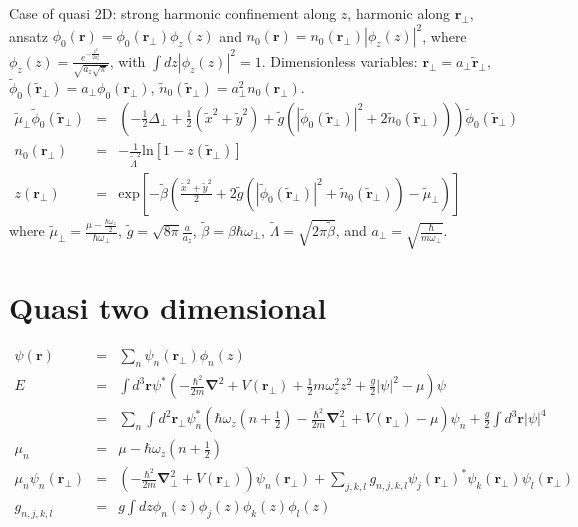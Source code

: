 \documentclass[12pt,a4paper]{report}
\newcommand{\abs}[1]{\left|#1\right|}
\renewcommand{\exp}[1]{\textrm{exp}\left[#1\right]}
\renewcommand{\ln}[1]{\textrm{ln}\left[#1\right]}
\begin{document}
Case of quasi 2D: strong harmonic confinement along $z$, harmonic along $\bm{r}_\perp$, ansatz $\phi_0(\bm{r})=\phi_0(\bm{r}_\perp)\phi_z(z)$ and $n_0(\bm{r})=n_0(\bm{r}_\perp)\abs{\phi_z(z)}^2$, where $\phi_z(z)=\frac{e^{-\frac{z^2}{2a_z^2}}}{\sqrt{a_z\sqrt{\pi}}}$, with $\int dz\abs{\phi_z(z)}^2=1$.
Dimensionless variables: $\bm{r}_\perp=a_\perp\tilde{\bm{r}}_\perp$, $\tilde{\phi}_0(\tilde{\bm{r}}_\perp)=a_\perp\phi_0(\bm{r}_\perp)$, $\tilde{n}_0(\tilde{\bm{r}}_\perp)=a_\perp^2n_0(\bm{r}_\perp)$.
\begin{eqnarray*}
\tilde{\mu}_\perp\tilde{\phi}_0(\tilde{\bm{r}}_\perp)
&=&\left(-\frac{1}{2}\Delta_\perp
+\frac{1}{2}(\tilde{x}^2+\tilde{y}^2)
+\tilde{g}
\left(\abs{\tilde{\phi}_0(\tilde{\bm{r}}_\perp)}^2+2\tilde{n}_0(\tilde{\bm{r}}_\perp)\right)\right)
\tilde{\phi}_0(\tilde{\bm{r}}_\perp)\\
n_0(\bm{r}_\perp)&=&-\frac{1}{\tilde{\Lambda}^2}\ln{1-z(\tilde{\bm{r}}_\perp)}\\
z(\bm{r}_\perp)&=&\exp{-\tilde{\beta}\left(\frac{\tilde{x}^2+\tilde{y}^2}{2}+2\tilde{g}\left(\abs{\tilde{\phi}_0(\tilde{\bm{r}}_\perp)}^2
+\tilde{n}_0(\tilde{\bm{r}}_\perp)\right)-\tilde{\mu}_\perp\right)}
\end{eqnarray*}
where $\tilde{\mu}_\perp=\frac{\mu-\frac{\hbar\omega_z}{2}}{\hbar\omega_\perp}$, $\tilde{g}=\sqrt{8\pi}\frac{a}{a_z}$, $\tilde{\beta}=\beta\hbar\omega_\perp$, $\tilde{\Lambda}=\sqrt{2\pi\tilde{\beta}}$, and $a_\perp=\sqrt{\frac{\hbar}{m\omega_\perp}}$.

\chapter{Quasi two dimensional}
\begin{eqnarray*}
\psi(\bm{r})&=&\sum_n\psi_n(\bm{r}_\perp)\phi_n(z)\\
E&=&\int d^3\bm{r}\psi^*\left(-\frac{\hbar^2}{2m}\bm{\nabla}^2+V(\bm{r}_\perp)+\frac{1}{2}m\omega_z^2z^2+\frac{g}{2}\abs{\psi}^2-\mu\right)\psi\\
&=&\sum_n\int d^2\bm{r}_\perp\psi_n^*\left(\hbar\omega_z\left(n+\frac{1}{2}\right)-\frac{\hbar^2}{2m}\bm{\nabla}_\perp^2+V(\bm{r}_\perp)-\mu\right)\psi_n
+\frac{g}{2}\int d^3\bm{r}\abs{\psi}^4\\
\mu_n&=&\mu-\hbar\omega_z\left(n+\frac{1}{2}\right)\\
\mu_n\psi_n(\bm{r}_\perp)&=&\left(-\frac{\hbar^2}{2m}\bm{\nabla}_\perp^2+V(\bm{r}_\perp)\right)\psi_n(\bm{r}_\perp)
+\sum_{j,k,l}g_{n,j,k,l}\psi_j(\bm{r}_\perp)^*\psi_k(\bm{r}_\perp)\psi_l(\bm{r}_\perp)\\
g_{n,j,k,l}&=&g\int dz\phi_n(z)\phi_j(z)\phi_k(z)\phi_l(z)\\
\end{eqnarray*}



\end{document}
